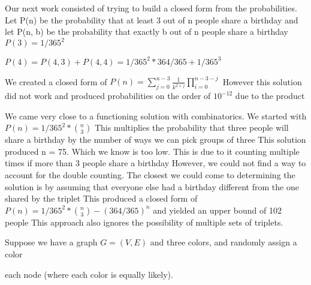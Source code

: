 \documentclass{article}
\begin{document}
Our next work consisted of trying to build a closed form from the probabilities. Let P(n) be the probability that at least 3 out of n people share a birthday
 and let P(n, b) be the probability that exactly b out of n people share a birthday
$P(3) = 1/365^2$

$P(4) = P(4,3) + P(4,4) = 1/365^2 * 364/365 + 1/365^3$

We created a closed form of $P(n) = \sum_{j=0}^{n-3} \frac{1}{k^{2+j}} \prod_{i=0}^{n-3-j}$ However
 this solution did not work and produced probabilities on the order of $10^{-12}$ due to the product


We came very close to a functioning solution with combinatorics. We started with $P(n) = 1/365^2 *  {n \choose 3}$ This multiplies the probability that three people will share a birthday by the number of ways we can pick groups of three
 This solution produced n = 75. Which we know is too low. This is due to it counting multiple times if more than 3 people share a birthday
 However, we could not find a way to account for the double counting. The closest we could come to determining the solution is by assuming that everyone else had a birthday different from the one shared by the triplet
 This produced a closed form of $P(n) = 1/365^2 * {n \choose 3}- (364/365)^n$ and yielded an upper bound of 102 people
 This approach also ignores the possibility of multiple sets of triplets. 





\nextprob

Suppose we have a graph $G=(V,E)$ and three colors, and randomly assign a color

each node (where each color is equally likely).
\end{document}
